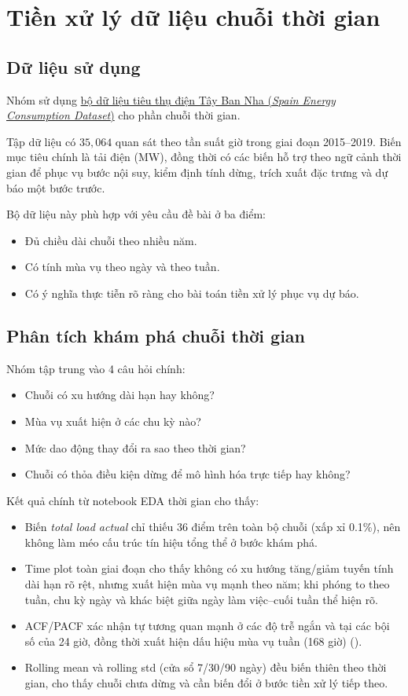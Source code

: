 \section{Tiền xử lý dữ liệu chuỗi thời gian}

\subsection{Dữ liệu sử dụng}
Nhóm sử dụng \href{https://www.kaggle.com/datasets/energy-consumption/spain-energy-consumption-dataset}{bộ dữ liệu tiêu thụ điện Tây Ban Nha (\textit{Spain Energy Consumption Dataset})} cho phần chuỗi thời gian.

Tập dữ liệu có $35{,}064$ quan sát theo tần suất giờ trong giai đoạn 2015--2019. Biến mục tiêu chính là tải điện (MW), đồng thời có các biến hỗ trợ theo ngữ cảnh thời gian để phục vụ bước nội suy, kiểm định tính dừng, trích xuất đặc trưng và dự báo một bước trước.

Bộ dữ liệu này phù hợp với yêu cầu đề bài ở ba điểm:
\begin{itemize}
    \item Đủ chiều dài chuỗi theo nhiều năm.
    \item Có tính mùa vụ theo ngày và theo tuần.
    \item Có ý nghĩa thực tiễn rõ ràng cho bài toán tiền xử lý phục vụ dự báo.
\end{itemize}

\subsection{Phân tích khám phá chuỗi thời gian}
Nhóm tập trung vào 4 câu hỏi chính:
\begin{itemize}
    \item Chuỗi có xu hướng dài hạn hay không?
    \item Mùa vụ xuất hiện ở các chu kỳ nào?
    \item Mức dao động thay đổi ra sao theo thời gian?
    \item Chuỗi có thỏa điều kiện dừng để mô hình hóa trực tiếp hay không?
\end{itemize}

Kết quả chính từ notebook EDA thời gian cho thấy:
\begin{itemize}
    \item Biến \textit{total load actual} chỉ thiếu 36 điểm trên toàn bộ chuỗi (xấp xỉ 0.1\%), nên không làm méo cấu trúc tín hiệu tổng thể ở bước khám phá.
    \item Time plot toàn giai đoạn cho thấy không có xu hướng tăng/giảm tuyến tính dài hạn rõ rệt, nhưng xuất hiện mùa vụ mạnh theo năm; khi phóng to theo tuần, chu kỳ ngày và khác biệt giữa ngày làm việc--cuối tuần thể hiện rõ.
    \item ACF/PACF xác nhận tự tương quan mạnh ở các độ trễ ngắn và tại các bội số của 24 giờ, đồng thời xuất hiện dấu hiệu mùa vụ tuần (168 giờ) (\cite{box2015time}).
    \item Rolling mean và rolling std (cửa sổ 7/30/90 ngày) đều biến thiên theo thời gian, cho thấy chuỗi chưa dừng và cần biến đổi ở bước tiền xử lý tiếp theo.
\end{itemize}

